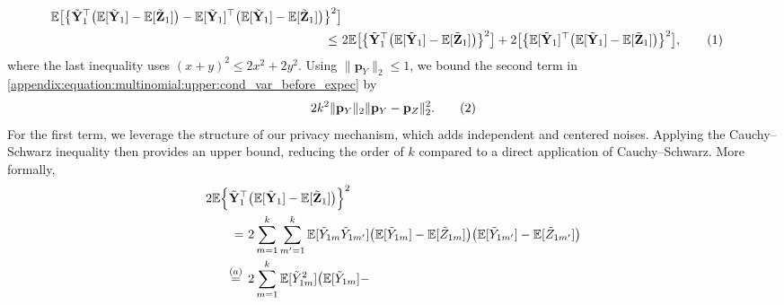 \documentclass[twoside,11pt]{article}
\newcommand\numberthis{\addtocounter{equation}{1}\tag{\theequation}}
\newcommand{\rvTwo}{Y}
\newcommand{\rvThree}{Z}
\newcommand{\vectorize}[1]{\mathbf{#1}}
\newcommand{\mE}{\mathbb{E}} %
\newcommand{\alphabetSize}{k} %
\newcommand{\vectorIndex}{m}
\newcommand{\probVec}{\mathbf{p}} %
\begin{document}
\begin{appendix}
\begin{itemize}
\begin{align*}
		\mE
		\bigl[
		\bigl\{
		\tilde{\vectorize{\rvTwo}}_1^\top
		\bigl(
		\mE [ \tilde{\vectorize{\rvTwo}}_{1}] - \mE [ \tilde{\vectorize{\rvThree}}_{1}]
		\bigr)
		-
		\mE [ \tilde{\vectorize{\rvTwo}}_{1}]^\top
		\bigl(
		\mE [ \tilde{\vectorize{\rvTwo}}_{1}] - \mE [ \tilde{\vectorize{\rvThree}}_{1}]
		\bigr)
		\bigr\}^2
		\bigr]
		\\  \leq ~ &
		2 \mE 
		\bigl[
		\bigl\{
		\tilde{\vectorize{\rvTwo}}_1^\top 
		\bigl(
		\mE [ \tilde{\vectorize{\rvTwo}}_{1}] - \mE [ \tilde{\vectorize{\rvThree}}_{1}]
		\bigr)
		\bigr\}^2
		\bigr]
		+
		2 
		\bigl[
		\bigl\{
		\mE [ \tilde{\vectorize{\rvTwo}}_{1}]^\top
		\bigl(
		\mE [ \tilde{\vectorize{\rvTwo}}_{1}] - \mE [ \tilde{\vectorize{\rvThree}}_{1}]
		\bigr)
		\bigr\}^2
		\bigr],
		\numberthis \label{appendix:equation:multinomial:upper:cond_var_before_expec}
	\end{align*}
	where the last inequality uses $(x+y)^2 \leq 2x^2 + 2y^2$. Using $\|\probVec_\rvTwo\|_2 \leq 1$, we bound the second term in \eqref{appendix:equation:multinomial:upper:cond_var_before_expec} by
	\begin{align*}
		2\alphabetSize^2 \|\probVec_\rvTwo\|_2
		\|\probVec_\rvTwo - \probVec_\rvThree\|_2^2.
		\numberthis \label{appendix:equation:multinomial:upper:cond_var_term_2}
	\end{align*}
	For the first term, we leverage the structure of our privacy mechanism, which adds independent and centered noises. Applying the Cauchy--Schwarz inequality then provides an upper bound, reducing the order of $\alphabetSize$ compared to a direct application of Cauchy--Schwarz. More formally,
	\begin{align*}
		2 \mE
		\Bigl\{
		\tilde{\vectorize{\rvTwo}}_1^\top&
		\bigl(
		\mE [ \tilde{\vectorize{\rvTwo}}_{1}] - \mE [ \tilde{\vectorize{\rvThree}}_{1}]
		\bigr)
		\Bigr\}^2
		\\ = ~ &
		2\sum_{\vectorIndex=1}^\alphabetSize
		\sum_{\vectorIndex'=1}^\alphabetSize
		\mE[
		\tilde{\rvTwo}_{1 \vectorIndex}
		\tilde{\rvTwo}_{1 \vectorIndex'}
		]
		\bigl(
		\mE [ \tilde{\rvTwo}_{1 \vectorIndex}]
		-
		\mE [ \tilde{\rvThree}_{1 \vectorIndex}]
		\bigr)
		\bigl(
		\mE [ \tilde{\rvTwo}_{1 \vectorIndex'}]
		-
		\mE [ \tilde{\rvThree}_{1 \vectorIndex'}]
		\bigr) 
		\\ \stackrel{(a)}{=} \hskip 1.57mm &
		2\sum_{\vectorIndex=1}^\alphabetSize
		\mE[ \tilde{\rvTwo}_{1 \vectorIndex}^2 ]
		\bigl(
		\mE [ \tilde{\rvTwo}_{1 \vectorIndex}]
		-

\end{align*}
\end{itemize}
\end{appendix}
\end{document}
